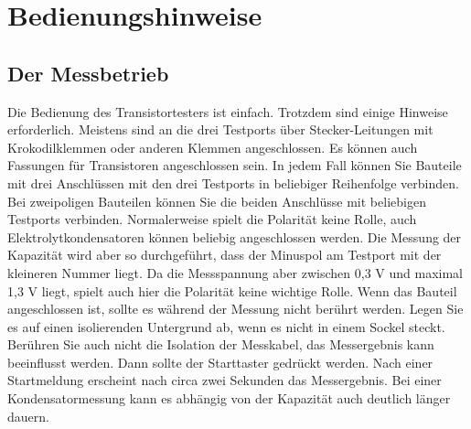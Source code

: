 \chapter{Bedienungshinweise}
\label{sec:manual}
\section{Der Messbetrieb}
Die Bedienung des Transistortesters ist einfach.
Trotzdem sind einige Hinweise erforderlich.
Meistens sind an die drei Testports über Stecker-Leitungen mit Krokodilklemmen oder anderen Klemmen angeschlossen.
Es können auch Fassungen für Transistoren angeschlossen sein.
In jedem Fall können Sie Bauteile mit drei Anschlüssen mit den drei Testports in beliebiger Reihenfolge verbinden.
Bei zweipoligen Bauteilen können Sie die beiden Anschlüsse mit beliebigen Testports verbinden.
Normalerweise spielt die Polarität keine Rolle, auch Elektrolytkondensatoren können beliebig angeschlossen werden.
Die Messung der Kapazität wird aber so durchgeführt, dass der Minuspol am Testport mit der kleineren Nummer liegt.
Da die Messspannung aber zwischen 0,3 V und maximal 1,3 V liegt, spielt auch hier die Polarität keine wichtige Rolle.
Wenn das Bauteil angeschlossen ist, sollte es während der Messung nicht berührt werden. Legen Sie es auf einen
isolierenden Untergrund ab, wenn es nicht in einem Sockel steckt. Berühren Sie auch nicht die Isolation der Messkabel,
das Messergebnis kann beeinflusst werden.
Dann sollte der Starttaster gedrückt werden.
Nach einer Startmeldung erscheint nach circa zwei Sekunden das Messergebnis. Bei einer Kondensatormessung kann es
abhängig von der Kapazität auch deutlich länger dauern.

